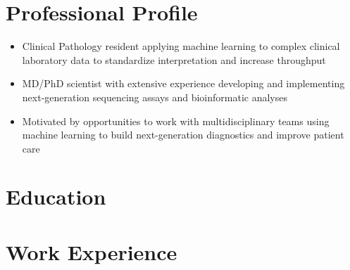 \documentclass[11pt,a4paper,]{moderncv}
\begin{document}
\makecvtitle



\hypertarget{professional-profile}{%
\section{Professional Profile}\label{professional-profile}}

\begin{itemize}[leftmargin = 3 cm]
  \item Clinical Pathology resident applying machine learning to
    complex clinical laboratory data to standardize 
    interpretation and increase throughput 
  
  \item MD/PhD scientist with extensive experience developing
    and implementing next-generation sequencing assays and
    bioinformatic analyses
    
  \item Motivated by opportunities to work with 
    multidisciplinary teams using machine learning to build
    next-generation diagnostics and improve patient care
    
\end{itemize}

\vspace{0 pt}

\hypertarget{education}{%
\section{Education}\label{education}}

\nopagebreak

\hypertarget{work-experience}{%
\section{Work Experience}\label{work-experience}}
\end{document}

